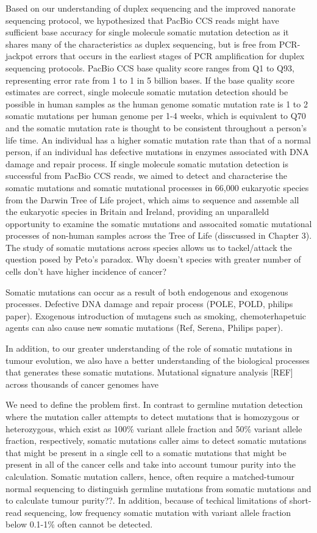 Based on our understanding of duplex sequencing and the improved nanorate sequencing protocol, we hypothesized that PacBio CCS reads might have sufficient base accuracy for single molecule somatic mutation detection as it shares many of the characteristics as duplex sequencing, but is free from PCR-jackpot errors that occurs in the earliest stages of PCR amplification for duplex sequencing protocols. PacBio CCS base quality score ranges from Q1 to Q93, representing error rate from 1 to 1 in 5 billion bases. If the base quality score estimates are correct, single molecule somatic mutation detection should be possible in human samples as the human genome somatic mutation rate is 1 to 2 somatic mutations per human genome per 1-4 weeks, which is equivalent to Q70 and the somatic mutation rate is thought to be consistent throughout a person's life time. An individual has a higher somatic mutation rate than that of a normal person, if an individual has defective mutations in enzymes associated with DNA damage and repair process. If single molecule somatic mutation detection is successful from PacBio CCS reads, we aimed to detect and characterise the somatic mutations and somatic mutational processes in 66,000 eukaryotic species from the Darwin Tree of Life project, which aims to sequence and assemble all the eukaryotic species in Britain and Ireland, providing an unparalleld opportunity to examine the somatic mutations and assocaited somatic mutational processes of non-human samples across the Tree of Life (disscussed in Chapter 3). The study of somatic mutations across species allows us to tackel/attack the question posed by Peto's paradox. Why doesn't species with greater number of cells don't have higher incidence of cancer?



Somatic mutations can occur as a result of both endogenous and exogenous processes. Defective DNA damage and repair process (POLE, POLD, philips paper). Exogenous introduction of mutagens such as smoking, chemoterhapetuic agents can also cause new somatic mutations (Ref, Serena, Philips paper).


In addition, to our greater understanding of the role of somatic mutations in tumour evolution, we also have a better understanding of the biological processes that generates these somatic mutations. Mutational signature analysis [REF] across thousands of cancer genomes have   


We need to define the problem first. In contrast to germline mutation detection where the mutation caller attempts to detect mutations that is homozygous or heterozygous, which exist as 100\% variant allele fraction and 50\% variant allele fraction, respectively, somatic mutations caller aims to detect somatic mutations that might be present in a single cell to a somatic mutations that might be present in all of the cancer cells and take into account tumour purity into the calculation. Somatic mutation callers, hence, often require a matched-tumour normal sequencing to distinguish germline mutations from somatic mutations and to calculate tumour purity??. In addition, because of techical limitations of short-read sequencing, low frequency somatic mutation with variant allele fraction below 0.1-1\% often cannot be detected. 


